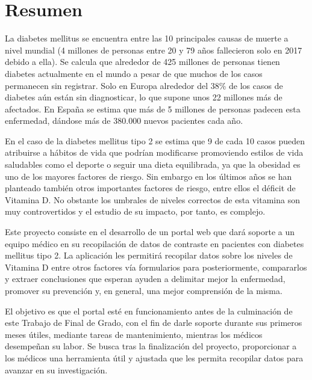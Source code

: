 \chapter*{Resumen}

   La diabetes mellitus se encuentra entre las 10 principales causas de muerte a nivel mundial (4 millones de personas entre 20 y 79 años fallecieron solo en 2017 debido a ella). Se calcula que alrededor de 425 millones de personas tienen diabetes actualmente en el mundo a pesar de que muchos de los casos permanecen sin registrar. Solo en Europa alrededor del 38\% de los casos de diabetes aún están sin diagnosticar, lo que supone unos 22 millones más de afectados. En España se estima que más de 5 millones de personas padecen esta enfermedad, dándose más de 380.000 nuevos pacientes cada año.  \newline
   
	En el caso de la diabetes mellitus tipo 2 se estima que 9 de cada 10 casos pueden atribuirse a hábitos de vida que podrían modificarse promoviendo estilos de vida saludables como el deporte o seguir una dieta equilibrada, ya que la obesidad es uno de los mayores factores de riesgo. Sin embargo en los últimos años se han planteado también otros importantes factores de riesgo, entre ellos el déficit de Vitamina D. No obstante los umbrales de niveles correctos de esta vitamina son muy controvertidos y el estudio de su impacto, por tanto, es complejo. \newline

    Este proyecto consiste en el desarrollo de un portal web que dará soporte a un equipo médico en su recopilación de datos de contraste en pacientes con diabetes mellitus tipo 2. La aplicación les permitirá recopilar datos sobre los niveles de Vitamina D entre otros factores vía formularios para posteriormente, compararlos y extraer conclusiones que esperan ayuden a delimitar mejor la enfermedad, promover su prevención y, en general, una mejor comprensión de la misma. \newline

    El objetivo es que el portal esté en funcionamiento antes de la culminación de este Trabajo de Final de Grado, con el fin de darle soporte durante sus primeros meses útiles, mediante tareas de mantenimiento, mientras los médicos desempeñan su labor. Se busca tras la finalización del proyecto, proporcionar a los médicos una herramienta útil y ajustada que les permita recopilar datos para avanzar en su investigación.

